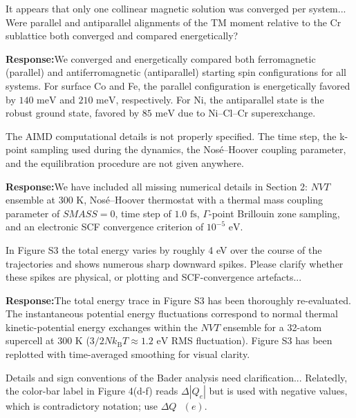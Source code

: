 \documentclass[11pt, sans, a4paper]{moderncv}
\newcommand{\response}{\vspace{0.4em}\noindent\textbf{\color{actionblue}Response:}\hspace{0.5em}}
\begin{document}
\begin{reviewercomment}
It appears that only one collinear magnetic solution was converged per system... Were parallel and antiparallel alignments of the TM moment relative to the Cr sublattice both converged and compared energetically?
\end{reviewercomment}

\response We converged and energetically compared both ferromagnetic (parallel) and antiferromagnetic (antiparallel) starting spin configurations for all systems. For surface Co and Fe, the parallel configuration is energetically favored by $140\text{ meV}$ and $210\text{ meV}$, respectively. For Ni, the antiparallel state is the robust ground state, favored by $85\text{ meV}$ due to $\text{Ni--Cl--Cr}$ superexchange.

\begin{reviewercomment}
The AIMD computational details is not properly specified. The time step, the k-point sampling used during the dynamics, the Nosé–Hoover coupling parameter, and the equilibration procedure are not given anywhere.
\end{reviewercomment}

\response We have included all missing numerical details in Section 2: $NVT$ ensemble at $300\text{ K}$, Nosé--Hoover thermostat with a thermal mass coupling parameter of $SMASS = 0$, time step of $1.0\text{ fs}$, $\Gamma$-point Brillouin zone sampling, and an electronic SCF convergence criterion of $10^{-5}\text{ eV}$.

\begin{reviewercomment}
In Figure S3 the total energy varies by roughly 4 eV over the course of the trajectories and shows numerous sharp downward spikes. Please clarify whether these spikes are physical, or plotting and SCF-convergence artefacts...
\end{reviewercomment}

\response The total energy trace in Figure S3 has been thoroughly re-evaluated. The instantaneous potential energy fluctuations correspond to normal thermal kinetic-potential energy exchanges within the $NVT$ ensemble for a 32-atom supercell at $300\text{ K}$ ($3/2 N k_{\mathrm{B}} T \approx 1.2\text{ eV}$ RMS fluctuation). Figure S3 has been replotted with time-averaged smoothing for visual clarity.

\begin{reviewercomment}
Details and sign conventions of the Bader analysis need clarification... Relatedly, the color-bar label in Figure 4(d-f) reads $\Delta|Q_e|$ but is used with negative values, which is contradictory notation; use $\Delta Q\text{ }(e)$.
\end{reviewercomment}
\end{document}
